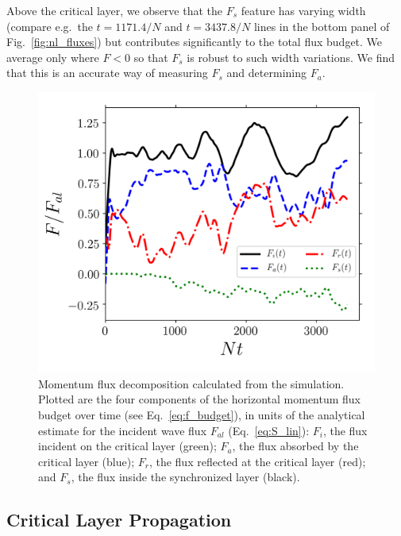 \documentclass[
        fleqn,
        usenatbib,
    ]{mnras}
\begin{document}
Above the critical layer, we observe that the $F_s$ feature has varying width
(compare e.g.\ the $t = 1171.4/N$ and $t = 3437.8/N$ lines in the bottom panel
of Fig.~\ref{fig:nl_fluxes}) but contributes significantly to the total
flux budget. We average only where $F < 0$ so that $F_s$ is robust to such width
variations. We find that this is an accurate way of measuring $F_s$ and
determining $F_a$.

\begin{figure}
    \centering
    \includegraphics[width=0.9\columnwidth]{plots/nl_f_amps2.png}
    \caption{Momentum flux decomposition calculated from the simulation. Plotted
    are the four components of the horizontal momentum flux budget over time
    (see Eq.~\eqref{eq:f_budget}), in units of the analytical estimate for the
    incident wave flux $F_{al}$ (Eq.~\eqref{eq:S_lin}): $F_i$, the flux incident
    on the critical layer (green); $F_a$, the flux absorbed by the critical
    layer (blue); $F_r$, the flux reflected at the critical layer (red); and
    $F_s$, the flux inside the synchronized layer
    (black).}\label{fig:nl_f_amps2}
\end{figure}

\subsection{Critical Layer Propagation}\label{ss:cl_prop}
\end{document}
